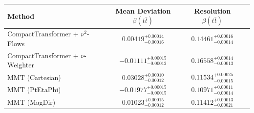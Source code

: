     \begin{tabular}{lccc}
        \toprule
        Method & Mean Deviation $\beta(t\bar{t})$ & Resolution $\beta(t\bar{t})$ \\
        \midrule
        CompactTransformer + $\nu^2$-Flows & $0.00419^{+0.00014}_{-0.00016}$ & $0.14461^{+0.00016}_{-0.00014}$ \\
        CompactTransformer + $\nu$-Weighter & $-0.01111^{+0.00015}_{-0.00012}$ & $0.16558^{+0.00014}_{-0.00013}$ \\
        MMT (Cartesian) & $0.03028^{+0.00010}_{-0.00012}$ & $0.11534^{+0.00025}_{-0.00015}$ \\
        MMT (PtEtaPhi) & $-0.01977^{+0.00015}_{-0.00015}$ & $0.10971^{+0.00011}_{-0.00014}$ \\
        MMT (MagDir) & $0.01023^{+0.00015}_{-0.00012}$ & $0.11412^{+0.00013}_{-0.00021}$ \\
        \bottomrule
    \end{tabular}